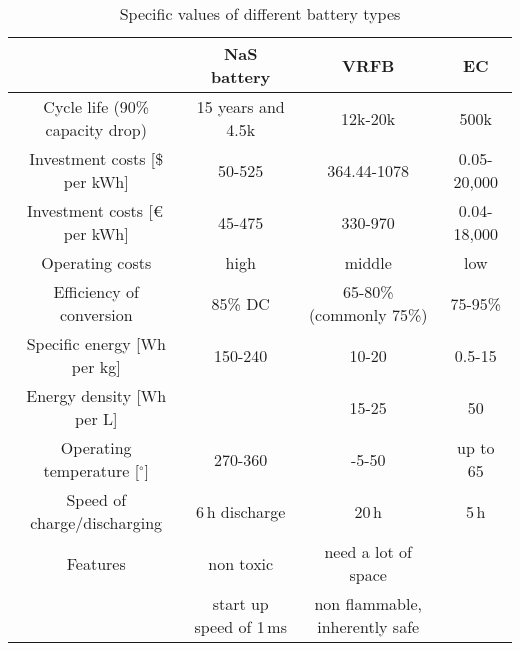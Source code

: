 \begin{table}[H]
\centering
\caption{Specific values of different battery types}
\begin{tabular}{cccc}
\toprule
& NaS battery & VRFB & EC\\
\midrule
Cycle life (90\% capacity drop) & 15 years and 4.5k&12k-20k& 500k\\
Investment costs [\$ per kWh] & 50-525 & 364.44-1078&0.05-20,000\\
Investment costs [\euro \,per kWh]& 45-475 & 330-970& 0.04-18,000\\
Operating costs& high & middle & low\\
Efficiency of conversion & 85\% DC & 65-80\% (commonly 75\%) & 75-95\%\\
Specific energy [Wh per kg] & 150-240 & 10-20&0.5-15\\
Energy density [Wh per L] & & 15-25& 50\\
Operating temperature [$^\circ$]& 270-360& -5-50& up to 65 \\ 
Speed of charge/discharging &6\,h discharge &20\,h&5\,h\\
Features& non toxic & need a lot of space & \\
&start up speed of 1\,ms& non flammable, inherently safe &\\
\bottomrule
\end{tabular}
\end{table}

\clearpage
\cfoot{}